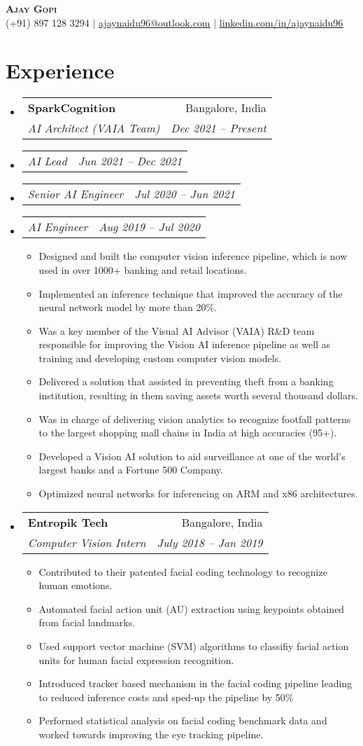 \documentclass[letterpaper,11pt]{article}
\makeatletter
\newcommand{\resumeItem}[1]{
  \item\small{
    {#1 \vspace{-2pt}}
  }
}
\newcommand{\resumeSubheading}[4]{
  \vspace{-2pt}\item
    \begin{tabular*}{0.97\textwidth}[t]{l@{\extracolsep{\fill}}r}
      \textbf{#1} & #2 \\
      \textit{\small#3} & \textit{\small #4} \\
    \end{tabular*}\vspace{-7pt}
}
\newcommand{\resumeSubSubheading}[2]{
    \item
    \begin{tabular*}{0.97\textwidth}{l@{\extracolsep{\fill}}r}
      \textit{\small#1} & \textit{\small #2} \\
    \end{tabular*}\vspace{-7pt}
}
\newcommand{\resumeSubHeadingListStart}{\begin{itemize}[leftmargin=0.15in, label={}]}
\newcommand{\resumeSubHeadingListEnd}{\end{itemize}}
\newcommand{\resumeItemListStart}{\begin{itemize}}
\newcommand{\resumeItemListEnd}{\end{itemize}\vspace{-5pt}}
\makeatother
\begin{document}
\begin{center}
    \textbf{\Huge \scshape Ajay Gopi} \\ \vspace{1pt}
    \small (+91) 897 128 3294 $|$ \href{mailto:ajaynaidu96@outlook.com}{\underline{ajaynaidu96@outlook.com}} $|$ 
    \href{https://www.linkedin.com/in/ajaynaidu96/}{\underline{linkedin.com/in/ajaynaidu96}}
\end{center}


\section{Experience}
  \resumeSubHeadingListStart

    \resumeSubheading
      {SparkCognition}{Bangalore, India}
      {AI Architect (VAIA Team)}{Dec 2021 -- Present}
      \resumeSubSubheading
        {AI Lead}{Jun 2021 -- Dec 2021}
      \resumeSubSubheading
        {Senior AI Engineer}{Jul 2020 -- Jun 2021}
      \resumeSubSubheading
        {AI Engineer}{Aug 2019 -- Jul 2020}
          \resumeItemListStart
            \resumeItem{Designed and built the computer vision inference pipeline, which is now used in over 1000+ banking and retail locations.}
            \resumeItem{Implemented an inference technique that improved the accuracy of the neural network model by more than 20\%.}
            \resumeItem{Was a key member of the Visual AI Advisor (VAIA) R\&D team responsible for improving the Vision AI inference pipeline as well as training and developing custom computer vision models.}
            \resumeItem{Delivered a solution that assisted in preventing theft from a banking institution, resulting in them saving assets worth several thousand dollars.}            
            \resumeItem{Was in charge of delivering vision analytics to recognize footfall patterns to the largest shopping mall chains in India at high accuracies (95+).}
            \resumeItem{Developed a Vision AI solution to aid surveillance at one of the world's largest banks and a Fortune 500 Company.}
            \resumeItem{Optimized neural networks for inferencing on ARM and x86 architectures.}
          \resumeItemListEnd

      \resumeSubheading
      {Entropik Tech}{Bangalore, India} 
      {Computer Vision Intern}{July 2018 -- Jan 2019}
      \resumeItemListStart
        \resumeItem{Contributed to their patented facial coding technology to recognize human emotions.}
        \resumeItem{Automated facial action unit (AU) extraction using keypoints obtained from facial landmarks.}
        \resumeItem{Used support vector machine (SVM) algorithms to classifiy facial action units for human facial expression recognition.}
        \resumeItem{Introduced tracker based mechanism in the facial coding pipeline leading to reduced inference costs and sped-up the pipeline by 50\%}
        \resumeItem{Performed statistical analysis on facial coding benchmark data and worked towards improving the eye tracking pipeline.}
      \resumeItemListEnd
  \resumeSubHeadingListEnd
\end{document}
